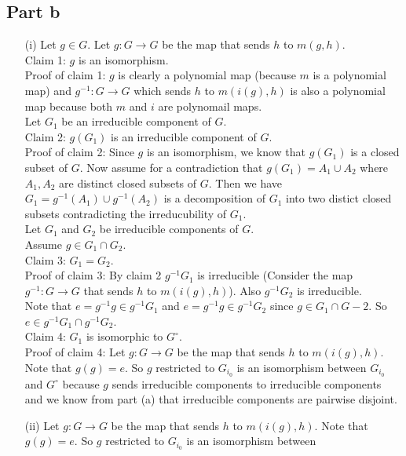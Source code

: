 \documentclass[12pt]{article}
\begin{document}
\clearpage
\subsection*{Part b}
\begin{enumerate}
\item[(i)] Let $g \in G$. Let $g: G \rightarrow G$ be the map that sends $h$ to $m(g,h)$. \\
Claim 1: $g$ is an isomorphism. \\
Proof of claim 1: $g$ is clearly a polynomial map (because $m$ is a polynomial map) and
$g^{-1}: G \rightarrow G$ which sends $h$ to $m(i(g),h)$ is also a polynomial map because both $m$ and $i$ are polynomail maps. \\
Let $G_1$ be an irreducible component of $G$. \\
Claim 2: $g(G_1)$ is an irreducible component of $G$. \\
Proof of claim 2: Since $g$ is an isomorphism, we know that $g(G_1)$ is a closed subset of $G$. Now assume for a contradiction that $g(G_1)=A_1 \cup A_2$ where $A_1,A_2$ are distinct closed subsets of $G$. Then we have $G_1=g^{-1}(A_1) \cup g^{-1}(A_2)$ is a decomposition of $G_1$ into two distict closed subsets contradicting the irreducubility of $G_1$. \\
Let $G_1$ and $G_2$ be irreducible components of $G$. \\
Assume $g \in G_1 \cap G_2$. \\
Claim 3: $G_1=G_2$. \\
Proof of claim 3:
By claim 2 $g^{-1}G_1$ is irreducible (Consider the map $g^{-1}:G \rightarrow G$ that sends $h$ to $m(i(g),h)$). Also $g^{-1}G_2$ is irreducible.\\
Note that $e =g^{-1}g \in g^{-1}G_1$ and $e =g^{-1}g \in g^{-1}G_2$ since $g  \in G_1 \cap G-2$. So $e \in g^{-1}G_1 \cap g^{-1}G_2$.  \\
Claim 4: $G_1$ is isomorphic to $G^{\circ}$. \\
Proof of claim 4:
Let $g: G \rightarrow G$ be the map that sends $h$ to $m(i(g),h)$. Note that
$g(g)=e$. So $g$ restricted to $G_{i_0}$ is an isomorphism between 
$G_{i_0}$ and $G^{\circ}$ because $g$ sends irreducible components to irreducible components and we know from part (a) that irreducible components are pairwise disjoint.
\\
\item[(ii)]
Let $g: G \rightarrow G$ be the map that sends $h$ to $m(i(g),h)$. Note that
$g(g)=e$. So $g$ restricted to $G_{i_0}$ is an isomorphism between 

\end{enumerate}
\end{document}

